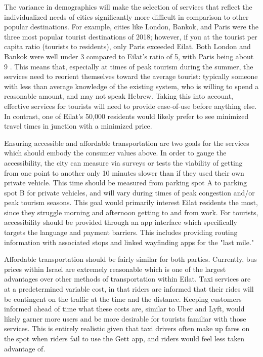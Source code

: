 \documentclass[12pt]{article}                       %
\begin{document}
The variance in demographics will make the selection of services that reflect the individualized needs of cities significantly more difficult in comparison to other popular destinations. For example, cities like London, Bankok, and Paris were the three most popular tourist destinations of 2018; however, if you at the tourist per capita ratio (tourists to residents), only Paris exceeded Eilat. Both London and Bankok were well under 3 compared to Eilat's ratio of 5, with Paris being about 9 \cite{Murray2018MostInsider}. This means that, especially at times of peak tourism during the summer, the services need to reorient themselves toward the average tourist: typically someone with less than average knowledge of the existing system, who is willing to spend a reasonable amount, and may not speak Hebrew. Taking this into account, effective services for tourists will need to provide ease-of-use before anything else. In contrast, one of Eilat's 50,000 residents would likely prefer to see minimized travel times in junction with a minimized price. 

Ensuring accessible and affordable transportation are two goals for the services which should embody the consumer values above. In order to gauge the accessibility, the city can measure via surveys or tests the viability of getting from one point to another only 10 minutes slower than if they used their own private vehicle. This time should be measured from parking spot A to parking spot B for private vehicles, and will vary during times of peak congestion and/or peak tourism seasons. This goal would primarily interest Eilat residents the most, since they struggle morning and afternoon getting to and from work. For tourists, accessibility should be provided through an app interface which specifically targets the language and payment barriers. This includes providing routing information with associated stops and linked wayfinding apps for the "last mile."

Affordable transportation should be fairly similar for both parties. Currently, bus prices within Israel are extremely reasonable which is one of the largest advantages over other methods of transportation within Eilat. Taxi services are at a predetermined variable cost, in that riders are informed that their rides will be contingent on the traffic at the time and the distance. Keeping customers informed ahead of time what these costs are, similar to Uber and Lyft, would likely garner more users and be more desirable for tourists familiar with those services. This is entirely realistic given that taxi drivers often make up fares on the spot when riders fail to use the Gett app, and riders would feel less taken advantage of.
\end{document}
